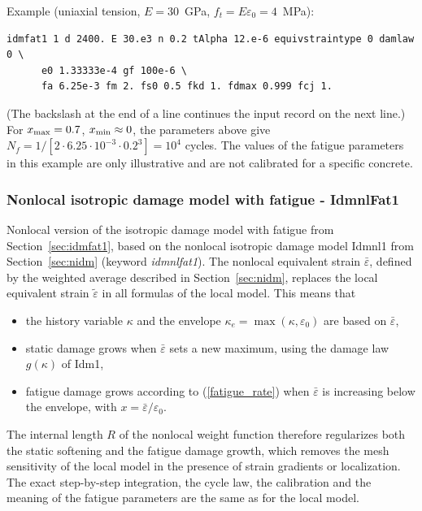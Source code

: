 \documentclass[a4paper]{article}
\begin{document}
\noindent Example (uniaxial tension, $E=30$~GPa, $f_t=E\varepsilon_0=4$~MPa):
\begin{verbatim}
idmfat1 1 d 2400. E 30.e3 n 0.2 tAlpha 12.e-6 equivstraintype 0 damlaw 0 \
      e0 1.33333e-4 gf 100e-6 \
      fa 6.25e-3 fm 2. fs0 0.5 fkd 1. fdmax 0.999 fcj 1.
\end{verbatim}
(The backslash at the end of a line continues the input record on the next line.)
For $x_{\rm max}=0.7$, $x_{\rm min}\approx 0$, the parameters above give $N_f=1/[2\cdot 6.25\cdot10^{-3}\cdot 0.2^3]=10^4$ cycles.
The values of the fatigue parameters in this example are only illustrative and are not calibrated for a specific concrete.

\clearpage

\subsubsection{Nonlocal isotropic damage model with fatigue - IdmnlFat1}
\label{sec:idmnlfat1}
Nonlocal version of the isotropic damage model with fatigue from Section~\ref{sec:idmfat1},
based on the nonlocal isotropic damage model Idmnl1 from Section~\ref{sec:nidm}
(keyword {\it idmnlfat1}). The nonlocal equivalent strain $\bar\varepsilon$, defined
by the weighted average described in Section~\ref{sec:nidm}, replaces the local equivalent strain
$\tilde\varepsilon$ in all formulas of the local model. This means that
\begin{itemize}
\item the history variable $\kappa$ and the envelope $\kappa_e=\max(\kappa,\varepsilon_0)$ are based on $\bar\varepsilon$,
\item static damage grows when $\bar\varepsilon$ sets a new maximum, using the damage law $g(\kappa)$ of Idm1,
\item fatigue damage grows according to (\ref{fatigue_rate}) when $\bar\varepsilon$ is increasing below the envelope,
with $x=\bar\varepsilon/\varepsilon_0$.
\end{itemize}
The internal length $R$ of the nonlocal weight function therefore regularizes both the static softening
and the fatigue damage growth, which removes the mesh sensitivity of the local model in the presence of strain gradients
or localization. The exact step-by-step integration, the cycle law, the calibration and the meaning of the fatigue parameters are the same as
for the local model.
\end{document}
